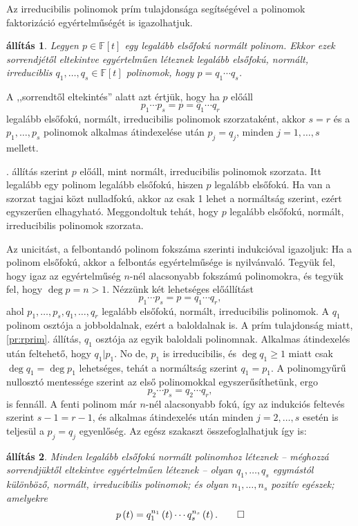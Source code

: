 \documentclass[9pt, a4paper, showtrims]{memoir}
\makeatletter
\let\Aref\relax
\renewenvironment{proof}[1][\proofname]
    {\par\pushQED{\qed}%
    \normalfont \topsep6\p@\@plus6\p@\relax
    \trivlist
    \item[\hskip\labelsep
        \itshape
    #1\@addpunct{:}]\ignorespaces}
    {\popQED\endtrivlist\@endpefalse}
\theoremstyle{plain}
\newtheorem{proposition}{állítás}[chapter]
\theoremstyle{remark}
\theoremstyle{definition}
\makeatother
\begin{document}
Az irreducibilis polinomok prím tulajdonsága segítségével a polinomok faktorizáció egyértelműségét is igazolhatjuk.
\begin{proposition}
	Legyen $p \in\mathbb{F}\left[ t \right]$ egy legalább elsőfokú normált polinom.
	Ekkor ezek sorrendjétől eltekintve egyértelműen léteznek legalább elsőfokú, normált, irreduciblis $q_1,\ldots,q_s\in\mathbb{F}\left[ t \right]$ polinomok,
	hogy $p=q_1\cdots q_s$.
\end{proposition}
A ,,sorrendtől eltekintés'' alatt azt értjük, hogy ha $p$ előáll
\[
	p_1\cdots p_s=p=q_1\cdots q_r
\]
legalább elsőfokú, normált, irreducibilis polinomok szorzataként,
akkor $s=r$ és a $p_1,\ldots,p_s$ polinomok alkalmas átindexelése után $p_j=q_j$,
minden $j=1,\ldots,s$ mellett.
\begin{proof}
	\Aref{pr:polfact}. állítás
	szerint $p$ előáll, mint normált, irreducibilis polinomok szorzata.
	Itt legalább egy polinom legalább elsőfokú, hiszen $p$ legalább elsőfokú.
	Ha van a szorzat tagjai közt nulladfokú, akkor az csak 1 lehet a normáltság szerint,
	ezért egyszerűen elhagyható.
	Meggondoltuk tehát, hogy $p$ legalább elsőfokú, normált, irreducibilis polinomok szorzata.

	Az unicitást,
	a felbontandó polinom fokszáma szerinti indukcióval igazoljuk:
	Ha a polinom elsőfokú, akkor a felbontás egyértelműsége is nyilvánvaló.
	Tegyük fel, hogy igaz az egyértelműség $n$-nél alacsonyabb fokszámú polinomokra,
	és tegyük fel, hogy $\deg p=n>1$.
	Nézzünk két lehetséges előállítást
	\[
		p_1\cdots p_s=p=q_1\cdots q_r,
	\]
	ahol $p_1,\ldots,p_s,q_1,\ldots,q_r$ legalább elsőfokú, normált, irreducibilis polinomok.
	A $q_1$ polinom osztója a jobboldalnak, ezért a baloldalnak is.
	A prím tulajdonság miatt, \ref{pr:rprim}. állítás, $q_1$ osztója az egyik baloldali polinomnak.
	Alkalmas átindexelés után feltehető, hogy $q_1|p_1$.
	No de, $p_1$ is irreducibilis, és $\deg q_1\geq 1$ miatt csak $\deg q_1=\deg p_1$ lehetséges,
	tehát a normáltság szerint $q_1=p_1$.
	A polinomgyűrű nullosztó mentessége szerint az első polinomokkal egyszerűsíthetünk, ergo
	\[
		p_2\cdots p_s=q_2\cdots q_r,
	\]
	is fennáll.
	A fenti polinom már $n$-nél alacsonyabb fokú,
	így az indukciós feltevés szerint $s-1=r-1$,
	és alkalmas átindexelés után minden $j=2,\ldots,s$ esetén is teljesül a $p_j=q_j$ egyenlőség.
\end{proof}
Az egész szakaszt összefoglalhatjuk így is:
\begin{proposition}
	Minden legalább elsőfokú normált polinomhoz léteznek
	--
	méghozzá sorrendjüktől eltekintve egyértelműen léteznek
	--
	olyan $q_1,\ldots,q_s$ egymástól különböző, normált, irreducibilis polinomok;
	és olyan $n_1,\ldots,n_s$ pozitív egészek;
	amelyekre
	\[
		p\left( t \right)
		=
		q_1^{n_1}\left( t \right)\cdots q_s^{n_s}\left( t \right).\qedhere
	\]
\end{proposition}
\end{document}
